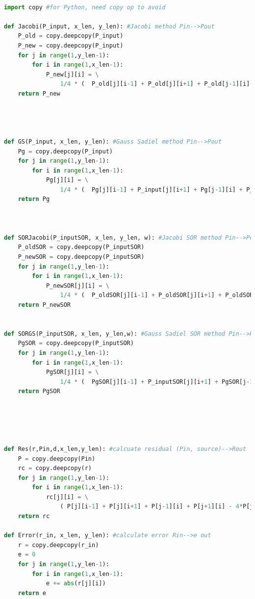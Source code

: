 \documentclass[12pt]{article}
\begin{document}


\begin{scriptsize}
    \begin{lstlisting}[language=python,caption={(3)-The python Source code}]

import copy #for Python, need copy op to avoid 

def Jacobi(P_input, x_len, y_len): #Jacobi method Pin-->Pout
    P_old = copy.deepcopy(P_input)
    P_new = copy.deepcopy(P_input)
    for j in range(1,y_len-1):
        for i in range(1,x_len-1): 
            P_new[j][i] = \
                1/4 * (  P_old[j][i-1] + P_old[j][i+1] + P_old[j-1][i] + P_old[j+1][i] )
    return P_new




def GS(P_input, x_len, y_len): #Gauss Sadiel method Pin-->Pout
    Pg = copy.deepcopy(P_input)
    for j in range(1,y_len-1):
        for i in range(1,x_len-1): 
            Pg[j][i] = \
                1/4 * (  Pg[j][i-1] + P_input[j][i+1] + Pg[j-1][i] + P_input[j+1][i] )
    return Pg



def SORJacobi(P_inputSOR, x_len, y_len, w): #Jacobi SOR method Pin-->Pout
    P_oldSOR = copy.deepcopy(P_inputSOR)
    P_newSOR = copy.deepcopy(P_inputSOR)
    for j in range(1,y_len-1):
        for i in range(1,x_len-1): 
            P_newSOR[j][i] = \
                1/4 * (  P_oldSOR[j][i-1] + P_oldSOR[j][i+1] + P_oldSOR[j-1][i] + P_oldSOR[j+1][i] ) *w + (1-w)*P_oldSOR[j][i]
    return P_newSOR


def SORGS(P_inputSOR, x_len, y_len,w): #Gauss Sadiel SOR method Pin-->Pout
    PgSOR = copy.deepcopy(P_inputSOR)
    for j in range(1,y_len-1):
        for i in range(1,x_len-1): 
            PgSOR[j][i] = \
                1/4 * (  PgSOR[j][i-1] + P_inputSOR[j][i+1] + PgSOR[j-1][i] + P_inputSOR[j+1][i] )*w + (1-w)*P_inputSOR[j][i]
    return PgSOR





def Res(r,Pin,d,x_len,y_len): #calcuate residual (Pin, source)-->Rout
    P = copy.deepcopy(Pin)
    rc = copy.deepcopy(r)
    for j in range(1,y_len-1):
        for i in range(1,x_len-1): 
            rc[j][i] = \
                ( P[j][i-1] + P[j][i+1] + P[j-1][i] + P[j+1][i] - 4*P[j][i] )/(d**2)
    return rc

def Error(r_in, x_len, y_len): #calculate error Rin-->e out
    r = copy.deepcopy(r_in)
    e = 0
    for j in range(1,y_len-1):
        for i in range(1,x_len-1): 
            e += abs(r[j][i])
    return e



\end{lstlisting}
\end{scriptsize}
\end{document}

